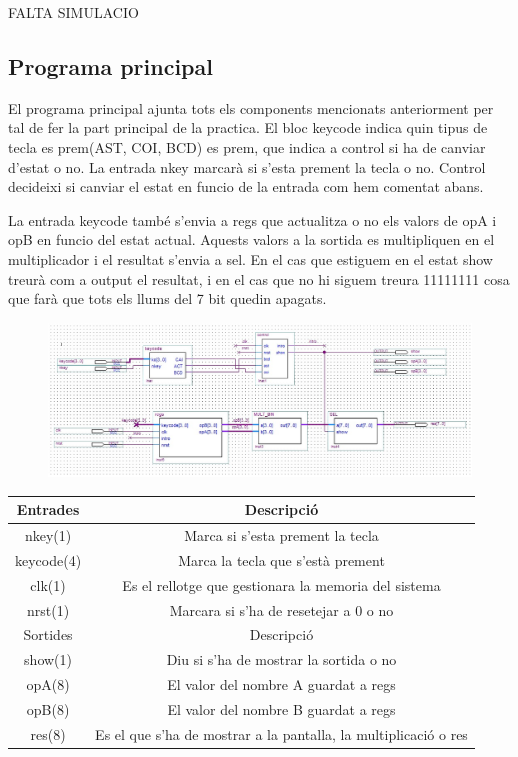 \documentclass[12pt, a4papre]{article}
\begin{document}
	FALTA SIMULACIO
	
	\subsection{Programa principal}
	
	El programa principal ajunta tots els components mencionats anteriorment per tal de fer la part principal de la practica. El bloc keycode indica quin tipus de tecla es prem(AST, COI, BCD) es prem, que indica a control si ha de canviar d'estat o no. La entrada nkey marcarà si s'esta prement la tecla o no. Control decideixi si canviar el estat en funcio de la entrada com hem comentat abans. 
	
	La entrada keycode també s'envia a regs que actualitza o no els valors de opA i opB en funcio del estat actual. Aquests valors a la sortida es multipliquen en el multiplicador i el resultat s'envia a sel. En el cas que estiguem en el estat show treurà com a output el resultat, i en el cas que no hi siguem treura 11111111 cosa que farà que tots els llums del 7 bit quedin apagats.
	
	\begin{figure}[H]
		\begin{center}
		\includegraphics[width=130mm]{ppal.jpeg}
		\end{center}
	\end{figure}
	
	\begin{table}[H]
		\centering
		 \begin{tabular}{|c | c|} 
			 \hline
			 Entrades & Descripció\\ [0.5ex] 
			 \hline
			 nkey(1) &  Marca si s'esta prement la tecla \\ 
			 keycode(4) & Marca la tecla que s'està prement \\
			 clk(1) & Es el rellotge que gestionara la memoria del sistema  \\
			 nrst(1) & Marcara si s'ha de resetejar a 0 o no \\ [1ex] 
			 \hline\hline
			 Sortides & Descripció\\ [0.5ex] 
			 \hline
			 show(1) & Diu si s'ha de mostrar la sortida o no\\ 
			 opA(8) & El valor del nombre A guardat a regs\\
			 opB(8) & El valor del nombre B guardat a regs\\
			 res(8) & Es el que s'ha de mostrar a la pantalla, la multiplicació o res\\ [1ex] 
			 \hline
		 \end{tabular}
	\end{table}
	
\end{document}
